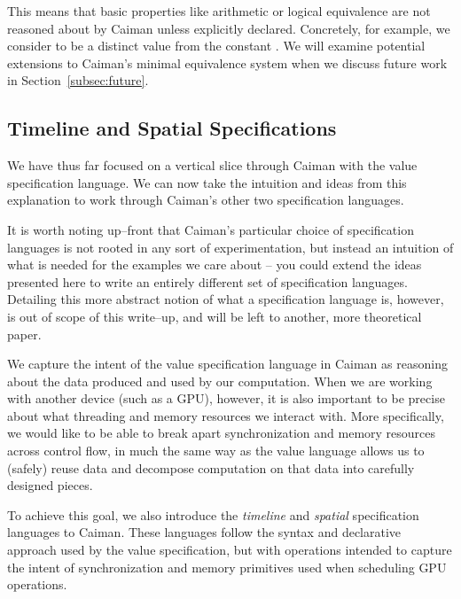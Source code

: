 This means that basic properties like arithmetic or logical equivalence are not reasoned about by Caiman unless explicitly declared.  Concretely, for example, we consider  to be a distinct value from the constant .  We will examine potential extensions to Caiman's minimal equivalence system when we discuss future work in Section~\ref{subsec:future}.

\subsection{Timeline and Spatial Specifications}
\label{subsec:spec}

We have thus far focused on a vertical slice through Caiman with the value specification language.  We can now take the intuition and ideas from this explanation to work through Caiman's other two specification languages.  

It is worth noting up--front that Caiman's particular choice of specification languages is not rooted in any sort of experimentation, but instead an intuition of what is needed for the examples we care about -- you could extend the ideas presented here to write an entirely different set of specification languages.  Detailing this more abstract notion of what a specification language is, however, is out of scope of this write--up, and will be left to another, more theoretical paper.

We capture the intent of the value specification language in Caiman as reasoning about the data produced and used by our computation.  When we are working with another device (such as a GPU), however, it is also important to be precise about what threading and memory resources we interact with.  More specifically, we would like to be able to break apart synchronization and memory resources across control flow, in much the same way as the value language allows us to (safely) reuse data and decompose computation on that data into carefully designed pieces.

To achieve this goal, we also introduce the \emph{timeline} and \emph{spatial} specification languages to Caiman.  These languages follow the syntax and declarative approach used by the value specification, but with operations intended to capture the intent of synchronization and memory primitives used when scheduling GPU operations.

